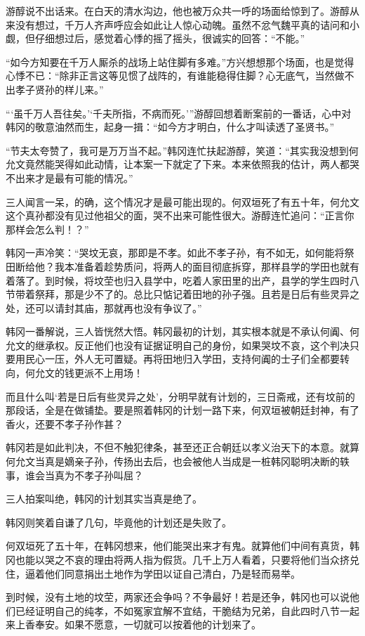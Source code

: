游醇说不出话来。在白天的清水沟边，他也被万众共一呼的场面给惊到了。游醇从来没有想过，千万人齐声呼应会如此让人惊心动魄。虽然不忿气魏平真的诘问和小觑，但仔细想过后，感觉着心悸的摇了摇头，很诚实的回答：“不能。”

“如今方知要在千万人厮杀的战场上站住脚有多难。”方兴想想那个场面，也是觉得心悸不已：“除非正言这等见惯了战阵的，有谁能稳得住脚？心无底气，当然做不出孝子贤孙的样儿来。”

“‘虽千万人吾往矣。’‘千夫所指，不病而死。’”游醇回想着断案前的一番话，心中对韩冈的敬意油然而生，起身一揖：“如今方才明白，什么才叫读透了圣贤书。”

“节夫太夸赞了，我可是万万当不起。”韩冈连忙扶起游醇，笑道：“其实我没想到何允文竟然能哭得如此动情，让本案一下就定了下来。本来依照我的估计，两人都哭不出来才是最有可能的情况。”

三人闻言一呆，的确，这个情况才是最可能出现的。何双垣死了有五十年，何允文这个真孙都没有见过他祖父的面，哭不出来可能性很大。游醇连忙追问：“正言你那样会怎么判！？”

韩冈一声冷笑：“哭坟无哀，那即是不孝。如此不孝子孙，有不如无，如何能将祭田断给他？我本准备着趁势质问，将两人的面目彻底拆穿，那样县学的学田也就有着落了。到时候，将坟茔也归入县学中，吃着人家田里的出产，县学的学生四时八节带着祭拜，那是少不了的。总比只惦记着田地的孙子强。且若是日后有些灵异之处，还可以请封其庙，那就再也没有争议了。”

韩冈一番解说，三人皆恍然大悟。韩冈最初的计划，其实根本就是不承认何阗、何允文的继承权。反正他们也没有证据证明自己的身份，如果哭坟不哀，这个判决只要用民心一压，外人无可置疑。再将田地归入学田，支持何阗的士子们全都要转向，何允文的钱更派不上用场！

而且什么叫‘若是日后有些灵异之处’，分明早就有计划的，三日斋戒，还有坟前的那段话，全是在做铺垫。要是照着韩冈的计划一路下来，何双垣被朝廷封神，有了香火，还要不孝子孙作甚？

韩冈若是如此判决，不但不触犯律条，甚至还正合朝廷以孝义治天下的本意。就算何允文当真是嫡亲子孙，传扬出去后，也会被他人当成是一桩韩冈聪明决断的轶事，谁会当真为不孝子孙叫屈？

三人拍案叫绝，韩冈的计划其实当真是绝了。

韩冈则笑着自谦了几句，毕竟他的计划还是失败了。

何双垣死了五十年，在韩冈想来，他们能哭出来才有鬼。就算他们中间有真货，韩冈也能以哭之不哀的理由将两人指为假货。几千上万人看着，只要将他们当众挤兑住，逼着他们同意捐出土地作为学田以证自己清白，乃是轻而易举。

到时候，没有土地的坟茔，两家还会争吗？不争最好！若是还争，韩冈也可以说他们已经证明自己的纯孝，不如冤家宜解不宜结，干脆结为兄弟，自此四时八节一起来上香奉安。如果不愿意，一切就可以按着他的计划来了。

